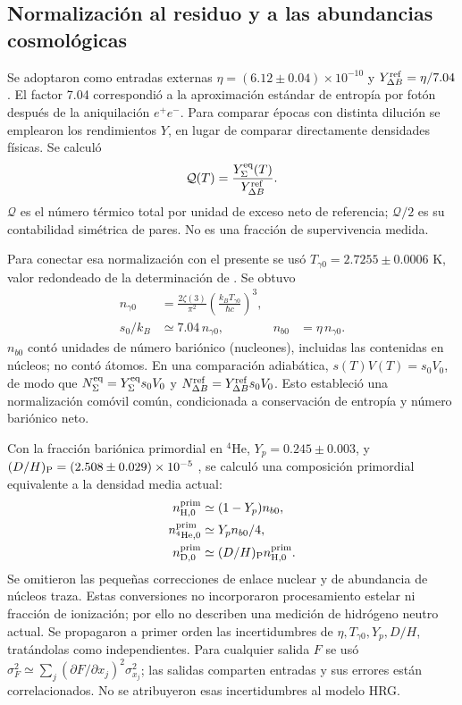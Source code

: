 \subsection{Normalización al residuo y a las abundancias cosmológicas}
Se adoptaron como entradas externas $\eta=(6.12\pm0.04)\times10^{-10}$ y $Y_{\Delta B}^{\rm ref}=\eta/7.04$ \citep{Fields2025}. El factor 7.04 correspondió a la aproximación estándar de entropía por fotón después de la aniquilación $e^+e^-$. Para comparar épocas con distinta dilución se emplearon los rendimientos $Y$, en lugar de comparar directamente densidades físicas. Se calculó
\begin{equation}
\mathcal Q(T)=\frac{Y_\Sigma^{\rm eq}(T)}{Y_{\Delta B}^{\rm ref}}.
\label{eq:populationratio}
\end{equation}
$\mathcal Q$ es el número térmico total por unidad de exceso neto de referencia; $\mathcal Q/2$ es su contabilidad simétrica de pares. No es una fracción de supervivencia medida.

Para conectar esa normalización con el presente se usó $T_{\gamma0}=2.7255\pm0.0006$ K, valor redondeado de la determinación de \citet{Fixsen2009}. Se obtuvo
\begin{align}
n_{\gamma0}&=\frac{2\zeta(3)}{\pi^2}
\left(\frac{k_BT_{\gamma0}}{\hbar c}\right)^3,\\
s_0/k_B&\simeq7.04\,n_{\gamma0}, & n_{b0}&=\eta\,n_{\gamma0}.
\label{eq:today}
\end{align}
$n_{b0}$ contó unidades de número bariónico (nucleones), incluidas las contenidas en núcleos; no contó átomos. En una comparación adiabática, $s(T)V(T)=s_0V_0$, de modo que $N_\Sigma^{\rm eq}=Y_\Sigma^{\rm eq}s_0V_0$ y $N_{\Delta B}^{\rm ref}=Y_{\Delta B}^{\rm ref}s_0V_0$. Esto estableció una normalización comóvil común, condicionada a conservación de entropía y número bariónico neto.

Con la fracción bariónica primordial en $^4$He, $Y_p=0.245\pm0.003$, y $(D/H)_{\rm P}=(2.508\pm0.029)\times10^{-5}$ \citep{Fields2025}, se calculó una composición primordial equivalente a la densidad media actual:
\begin{align}
n_{{\rm H},0}^{\rm prim}&\simeq(1-Y_p)n_{b0},\\
n_{{}^4{\rm He},0}^{\rm prim}&\simeq Y_p n_{b0}/4,\\
n_{{\rm D},0}^{\rm prim}&\simeq(D/H)_{\rm P}n_{{\rm H},0}^{\rm prim}.
\label{eq:hydrogen}
\end{align}
Se omitieron las pequeñas correcciones de enlace nuclear y de abundancia de núcleos traza. Estas conversiones no incorporaron procesamiento estelar ni fracción de ionización; por ello no describen una medición de hidrógeno neutro actual. Se propagaron a primer orden las incertidumbres de $\eta,T_{\gamma0},Y_p,D/H$, tratándolas como independientes. Para cualquier salida $F$ se usó $\sigma_F^2\simeq\sum_j(\partial F/\partial x_j)^2\sigma_{x_j}^2$; las salidas comparten entradas y sus errores están correlacionados. No se atribuyeron esas incertidumbres al modelo HRG.

